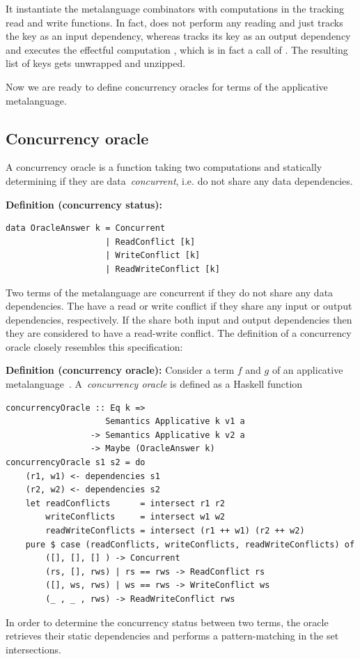 It instantiate the metalanguage combinators with computations in the tracking read
and write functions. In fact,  does not perform any reading and just tracks
the key as an input dependency, whereas  tracks its key as
an output dependency and executes the effectful computation , which is
in fact a call of . The resulting list of keys gets unwrapped and
unzipped.

Now we are ready to define concurrency oracles for terms of the
applicative metalanguage.

\newpage
\subsection{Concurrency oracle}
A concurrency oracle is a function taking two computations and statically
determining if they are data~\emph{concurrent}, i.e. do not share any
data dependencies.


\textbf{Definition (concurrency status):\label{def:concurrency-status}}
\begin{verbatim}
data OracleAnswer k = Concurrent
                    | ReadConflict [k]
                    | WriteConflict [k]
                    | ReadWriteConflict [k]
\end{verbatim}

\noindent Two terms of the metalanguage are concurrent if they do not share any data dependencies.
The have a read or write conflict if they share any input or output dependencies,
respectively. If the share both input and output dependencies then they are considered to
have a read-write conflict. The definition of a concurrency oracle closely resembles
this specification:

\textbf{Definition (concurrency oracle):\label{def:oracle}}
Consider a term $f$ and $g$ of an applicative metalanguage~.
A~\emph{concurrency oracle} is defined as a Haskell function
\begin{verbatim}
concurrencyOracle :: Eq k =>
                    Semantics Applicative k v1 a
                 -> Semantics Applicative k v2 a
                 -> Maybe (OracleAnswer k)
concurrencyOracle s1 s2 = do
    (r1, w1) <- dependencies s1
    (r2, w2) <- dependencies s2
    let readConflicts      = intersect r1 r2
        writeConflicts     = intersect w1 w2
        readWriteConflicts = intersect (r1 ++ w1) (r2 ++ w2)
    pure $ case (readConflicts, writeConflicts, readWriteConflicts) of
        ([], [], [] ) -> Concurrent
        (rs, [], rws) | rs == rws -> ReadConflict rs
        ([], ws, rws) | ws == rws -> WriteConflict ws
        (_ , _ , rws) -> ReadWriteConflict rws
\end{verbatim}
In order to determine the concurrency status between two terms, the oracle
retrieves their static dependencies and performs a pattern-matching in the
set intersections.

